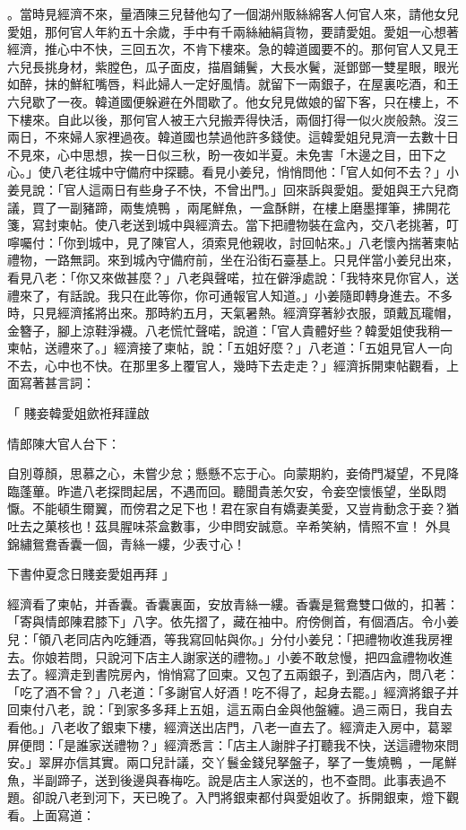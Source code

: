 \begin{showcontents}{}
。當時見經濟不來，量酒陳三兒替他勾了一個湖州販絲綿客人何官人來，請他女兒愛姐，那何官人年約五十余歲，手中有千兩絲紬絹貨物，要請愛姐。愛姐一心想著經濟，推心中不快，三回五次，不肯下樓來。急的韓道國要不的。那何官人又見王六兒長挑身材，紫膛色，瓜子面皮，描眉鋪鬢，大長水鬢，涎鄧鄧一雙星眼，眼光如醉，抹的鮮紅嘴唇，料此婦人一定好風情。就留下一兩銀子，在屋裏吃酒，和王六兒歇了一夜。韓道國便躲避在外間歇了。他女兒見做娘的留下客，只在樓上，不下樓來。自此以後，那何官人被王六兒搬弄得快活，兩個打得一似火炭般熱。沒三兩日，不來婦人家裡過夜。韓道國也禁過他許多錢使。這韓愛姐兒見濟一去數十日不見來，心中思想，挨一日似三秋，盼一夜如半夏。未免害「木邊之目，田下之心。」使八老往城中守備府中探聽。看見小姜兒，悄悄問他：「官人如何不去？」小姜見說：「官人這兩日有些身子不快，不曾出門。」回來訴與愛姐。愛姐與王六兒商議，買了一副豬蹄，兩隻燒鴨 ，兩尾鮮魚，一盒酥餅，在樓上磨墨揮筆，拂開花箋，寫封柬帖。使八老送到城中與經濟去。當下把禮物裝在盒內，交八老挑著，叮嚀囑付：「你到城中，見了陳官人，須索見他親收，討回帖來。」八老懷內揣著柬帖禮物，一路無詞。來到城內守備府前，坐在沿街石臺基上。只見伴當小姜兒出來，看見八老：「你又來做甚麼？」八老與聲喏，拉在僻淨處說：「我特來見你官人，送禮來了，有話說。我只在此等你，你可通報官人知道。」小姜隨即轉身進去。不多時，只見經濟搖將出來。那時約五月，天氣暑熱。經濟穿著紗衣服，頭戴瓦瓏帽，金簪子，腳上涼鞋淨襪。八老慌忙聲喏，說道：「官人貴體好些？韓愛姐使我稍一柬帖，送禮來了。」經濟接了柬帖，說：「五姐好麼？」八老道：「五姐見官人一向不去，心中也不快。在那里多上覆官人，幾時下去走走？」經濟拆開柬帖觀看，上面寫著甚言詞：

「                        賤妾韓愛姐歛袵拜謹啟

情郎陳大官人台下：

自別尊顏，思慕之心，未嘗少怠；懸懸不忘于心。向蒙期約，妾倚門凝望，不見降臨蓬蓽。昨遣八老探問起居，不遇而回。聽聞貴恙欠安，令妾空懷悵望，坐臥悶懨。不能頓生爾翼，而傍君之足下也！君在家自有嬌妻美愛，又豈肯動念于妾？猶吐去之菓核也！茲具腥味茶盒數事，少申問安誠意。辛希笑納，情照不宣！  外具錦繡鴛鴦香囊一個，青絲一縷，少表寸心！

下書仲夏念日賤妾愛姐再拜  」

經濟看了柬帖，并香囊。香囊裏面，安放青絲一縷。香囊是鴛鴦雙口做的，扣著：「寄與情郎陳君膝下」八字。依先摺了，藏在袖中。府傍側首，有個酒店。令小姜兒：「領八老同店內吃鍾酒，等我寫回帖與你。」分付小姜兒：「把禮物收進我房裡去。你娘若問，只說河下店主人謝家送的禮物。」小姜不敢怠慢，把四盒禮物收進去了。經濟走到書院房內，悄悄寫了回柬。又包了五兩銀子，到酒店內，問八老：「吃了酒不曾？」八老道：「多謝官人好酒！吃不得了，起身去罷。」經濟將銀子并回柬付八老，說：「到家多多拜上五姐，這五兩白金與他盤纏。過三兩日，我自去看他。」八老收了銀柬下樓，經濟送出店門，八老一直去了。經濟走入房中，葛翠屏便問：「是誰家送禮物？」經濟悉言：「店主人謝胖子打聽我不快，送這禮物來問安。」翠屏亦信其實。兩口兒計議，交丫鬟金錢兒拏盤子，拏了一隻燒鴨 ，一尾鮮魚，半副蹄子，送到後邊與春梅吃。說是店主人家送的，也不查問。此事表過不題。卻說八老到河下，天已晚了。入門將銀柬都付與愛姐收了。拆開銀柬，燈下觀看。上面寫道：


\end{showcontents}
